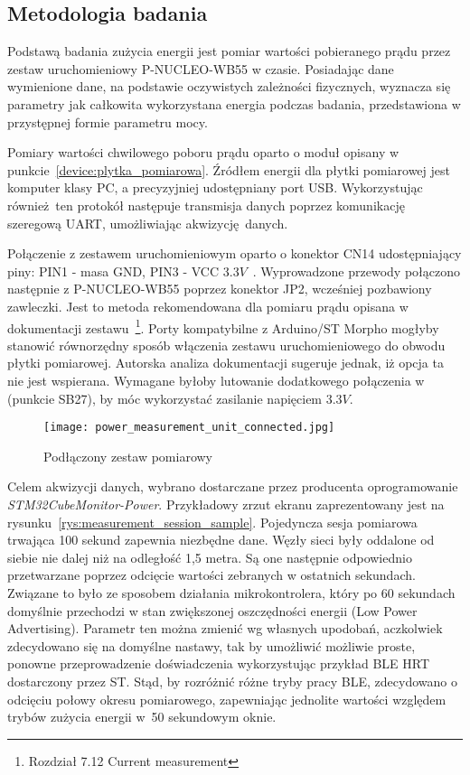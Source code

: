 \subsection{Metodologia badania}

Podstawą badania zużycia energii jest pomiar wartości pobieranego prądu przez zestaw uruchomieniowy
P-NUCLEO-WB55 w czasie. Posiadając dane wymienione dane, na podstawie oczywistych
zależności fizycznych, wyznacza się parametry jak całkowita wykorzystana energia
podczas badania, przedstawiona w przystępnej formie parametru mocy.

Pomiary wartości chwilowego poboru prądu oparto o moduł opisany w punkcie~\ref{device:plytka_pomiarowa}.
Źródłem energii dla płytki pomiarowej jest komputer klasy PC, a precyzyjniej udostępniany
port USB. Wykorzystując również ten protokół następuje transmisja danych poprzez komunikację szeregową
UART, umożliwiając akwizycję danych.

Połączenie z zestawem uruchomieniowym oparto o konektor CN14 udostępniający piny: PIN1 - masa GND, PIN3 - VCC $3.3V$~\cite{noauthor_um2243_2018}.
Wyprowadzone przewody połączono następnie z P-NUCLEO-WB55 poprzez konektor JP2, wcześniej pozbawiony zawleczki.
Jest to metoda rekomendowana dla pomiaru prądu opisana w dokumentacji zestawu~\cite{stmicroelectronics_um2435_2019}\footnote{
Rozdział 7.12 Current measurement}. Porty kompatybilne z Arduino/ST Morpho mogłyby stanowić równorzędny sposób
włączenia zestawu uruchomieniowego do obwodu płytki pomiarowej. Autorska analiza dokumentacji sugeruje jednak,
iż opcja ta nie jest wspierana. Wymagane byłoby lutowanie dodatkowego połączenia w (punkcie SB27), by móc wykorzystać
zasilanie napięciem $3.3V$.

\begin{figure}[!ht]
	\centering \texttt{[image: power\_measurement\_unit\_connected.jpg]}
	\caption{Podłączony zestaw pomiarowy}
	\label{rys:connected_power_measurement_unit}
\end{figure}

Celem akwizycji danych, wybrano dostarczane przez producenta oprogramowanie \textit{STM32CubeMonitor-Power}.
Przykładowy zrzut ekranu zaprezentowany jest na rysunku~\ref{rys:measurement_session_sample}.
Pojedyncza sesja pomiarowa trwająca 100 sekund zapewnia niezbędne dane. Węzły sieci
były oddalone od siebie nie dalej niż na odległość 1,5 metra. Są one następnie
odpowiednio przetwarzane poprzez odcięcie wartości zebranych w ostatnich sekundach. Związane to było
ze sposobem działania mikrokontrolera, który po 60 sekundach domyślnie przechodzi w stan zwiększonej
oszczędności energii (Low Power Advertising). Parametr ten można zmienić wg własnych upodobań, aczkolwiek zdecydowano
się na domyślne nastawy, tak by umożliwić możliwie proste, ponowne przeprowadzenie doświadczenia wykorzystując przykład
BLE \gls{HRT} dostarczony przez ST. Stąd, by rozróżnić różne tryby pracy \gls{BLE}, zdecydowano o odcięciu
połowy okresu pomiarowego, zapewniając jednolite wartości względem trybów zużycia energii
w~50 sekundowym oknie.

